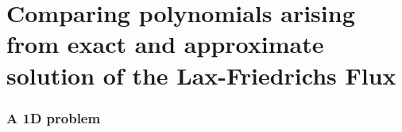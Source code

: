 \documentclass{beamer}
\begin{document}

\part{Comparing polynomials arising from exact and approximate solution of the Lax-Friedrichs Flux}
\label{part:polynomialstuff}

\section{A 1D problem}
\label{sec:interpretation-as-1d-problem}

\newcommand{\twopoints}[3]{
  \draw[fill=#3] (#1,#2) circle (0.05);
  \draw[xshift=0.1cm,yshift=0.1cm,fill=#3] (#1,#2) circle (0.05);
}
\end{document}
